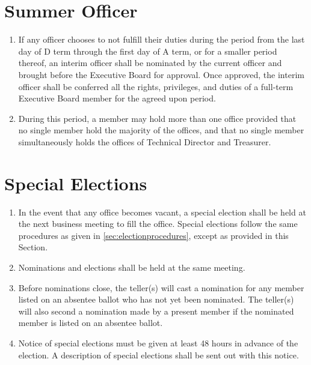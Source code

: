 \documentclass[12pt,letterpaper,oneside]{book}
\begin{document}
\section{Summer Officer} \label{sec:summerofficer}

\begin{enumerate}

\item If any officer chooses to not fulfill their duties during the period from the last day of D term through the first day of A term, or for a smaller period thereof, an interim officer shall be nominated by the current officer and brought before the Executive Board for approval. Once approved, the interim officer shall be conferred all the rights, privileges, and duties of a full-term Executive Board member for the agreed upon period.
\item During this period, a member may hold more than one office provided that no single member hold the majority of the offices, and that no single member simultaneously holds the offices of Technical Director and Treasurer.

\end{enumerate}

\section{Special Elections} \label{sec:specialelections}

\begin{enumerate}

\item In the event that any office becomes vacant, a special election shall be held at the next business meeting to fill the office. Special elections follow the same procedures as given in \cref{sec:electionprocedures}, except as provided in this Section.
\item Nominations and elections shall be held at the same meeting.
\item  Before nominations close, the teller(s) will cast a nomination for any member listed on an absentee ballot who has not yet been nominated. The teller(s) will also second a nomination made by a present member if the nominated member is listed on an absentee ballot.
\item Notice of special elections must be given at least 48 hours in advance of the election. A description of special elections shall be sent out with this notice.

\end{enumerate}
\end{document}
